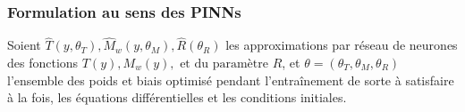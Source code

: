 \documentclass[12pt, oneside]{report} %
\theoremstyle{definition}
\theoremstyle{remark}
\newtheorem*{rem}{\textbf{Remarque : }}
\begin{document}
	\subsubsection*{Formulation au sens des PINNs}
	Soient $ \hat{T}(y, \theta_T), \hat{M}_w(y, \theta_M), \hat{R}( \theta_R)$ les approximations par réseau de neurones des fonctions $T(y), M_w(y), \text{ et du paramètre }R$, et $\theta = (\theta_T, \theta_M, \theta_R) $ l'ensemble des poids et biais optimisé pendant l'entraînement de sorte à satisfaire à la fois, les équations différentielles et les conditions initiales. 
	
\end{document}

